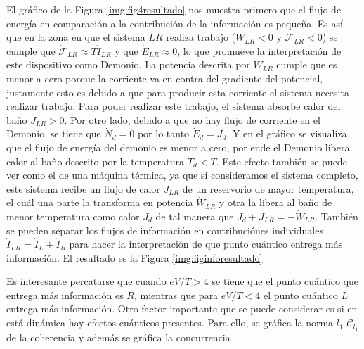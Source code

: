El gráfico de la Figura \ref{img:fig4resultado} nos muestra primero que el flujo de energía en comparación a la contribución de la información es pequeña. Es así que en la zona en que el sistema $LR$ realiza trabajo ($\dot{W}_{LR}<0$ y  $\dot{\mathcal{F}}_{LR}<0$) se cumple que $\dot{\mathcal{F}}_{LR}\approx T\dot{I}_{LR}$ y que $\dot{E}_{LR}\approx 0$, lo que promueve la interpretación de este dispositivo como Demonio. La potencia descrita por $\dot{W}_{LR}$ cumple que es menor a cero porque la corriente va en contra del gradiente del potencial, justamente esto es debido a que para producir esta corriente el sistema necesita realizar trabajo. Para poder realizar este trabajo, el sistema absorbe calor del baño $J_{LR}>0$. Por otro lado, debido a que no hay flujo de corriente en el Demonio, se tiene que $\dot{N}_{d}=0$ por lo tanto  $\dot{E}_{d} = J_{d}$. Y en el gráfico se visualiza que el flujo de energía del demonio es menor a cero, por ende el Demonio libera calor al baño descrito por la temperatura $T_{d}<T$. Este efecto también se puede ver como el de una máquina térmica, ya que si consideramos el sistema completo, este sistema recibe un flujo de calor $J_{LR}$ de un reservorio de mayor temperatura, el cuál una parte la transforma en potencia $\dot{W}_{LR}$ y otra la libera al baño de menor temperatura como calor $J_{d}$ de tal manera que $J_{d} + J_{LR} = - \dot{W}_{LR}$. También se pueden separar los flujos de información en contribuciónes individuales $\dot{I}_{LR} = \dot{I}_{L}+\dot{I}_{R}$ para hacer la interpretación de que punto cuántico entrega más información. El resultado es la Figura \ref{img:figinforesultado}
  

Es interesante percatarse que cuando $eV/T>4$ se tiene que el punto cuántico que entrega más información es $R$, mientras que para $eV/T<4$ el punto cuántico $L$ entrega más información.  
Otro factor importante que se puede considerar es si en está dinámica hay efectos cuánticos presentes. Para ello, se gráfica la norma-$l_{1}$ $\mathcal{C}_{l_{1}}$ de la coherencia y además se gráfica la concurrencia 


